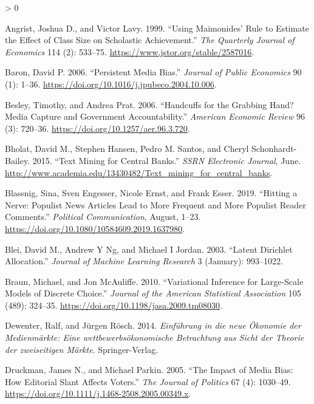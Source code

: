 \documentclass[
  12pt,
]{article}
\newlength{\cslhangindent}
\newenvironment{CSLReferences}[2] %
 {%
  \setlength{\parindent}{0pt}
  \ifodd #1 \everypar{\setlength{\hangindent}{\cslhangindent}}\ignorespaces\fi
  \ifnum #2 > 0
  \setlength{\parskip}{#2\baselineskip}
  \fi
 }%
 {}
\begin{document}
\hypertarget{refs}{}
\begin{CSLReferences}{1}{0}
\leavevmode\hypertarget{ref-angrist_using_1999}{}%
Angrist, Joshua D., and Victor Lavy. 1999. {``Using Maimonides' Rule to
Estimate the Effect of Class Size on Scholastic Achievement.''}
\emph{The Quarterly Journal of Economics} 114 (2): 533--75.
\url{https://www.jstor.org/stable/2587016}.

\leavevmode\hypertarget{ref-baron_persistent_2006}{}%
Baron, David P. 2006. {``Persistent Media Bias.''} \emph{Journal of
Public Economics} 90 (1): 1--36.
\url{https://doi.org/10.1016/j.jpubeco.2004.10.006}.

\leavevmode\hypertarget{ref-besley_handcuffs_2006}{}%
Besley, Timothy, and Andrea Prat. 2006. {``Handcuffs for the Grabbing
Hand? Media Capture and Government Accountability.''} \emph{American
Economic Review} 96 (3): 720--36.
\url{https://doi.org/10.1257/aer.96.3.720}.

\leavevmode\hypertarget{ref-bholat_text_2015}{}%
Bholat, David M., Stephen Hansen, Pedro M. Santos, and Cheryl
Schonhardt-Bailey. 2015. {``Text Mining for Central Banks.''}
\emph{{SSRN} Electronic Journal}, June.
\url{http://www.academia.edu/13430482/Text_mining_for_central_banks}.

\leavevmode\hypertarget{ref-blassnig_hitting_2019}{}%
Blassnig, Sina, Sven Engesser, Nicole Ernst, and Frank Esser. 2019.
{``Hitting a Nerve: Populist News Articles Lead to More Frequent and
More Populist Reader Comments.''} \emph{Political Communication},
August, 1--23. \url{https://doi.org/10.1080/10584609.2019.1637980}.

\leavevmode\hypertarget{ref-blei_latent_2003}{}%
Blei, David M., Andrew Y Ng, and Michael I Jordan. 2003. {``Latent
Dirichlet Allocation.''} \emph{Journal of Machine Learning Research} 3
(January): 993--1022.

\leavevmode\hypertarget{ref-braun_variational_2010}{}%
Braun, Michael, and Jon McAuliffe. 2010. {``Variational Inference for
Large-Scale Models of Discrete Choice.''} \emph{Journal of the American
Statistical Association} 105 (489): 324--35.
\url{https://doi.org/10.1198/jasa.2009.tm08030}.

\leavevmode\hypertarget{ref-dewenter_einfuhrung_2014}{}%
Dewenter, Ralf, and Jürgen Rösch. 2014. \emph{Einführung in die neue
Ökonomie der Medienmärkte: Eine wettbewerbsökonomische Betrachtung aus
Sicht der Theorie der zweiseitigen Märkte}. Springer-Verlag.

\leavevmode\hypertarget{ref-druckman_impact_2005}{}%
Druckman, James N., and Michael Parkin. 2005. {``The Impact of Media
Bias: How Editorial Slant Affects Voters.''} \emph{The Journal of
Politics} 67 (4): 1030--49.
\url{https://doi.org/10.1111/j.1468-2508.2005.00349.x}.


\end{CSLReferences}
\end{document}
